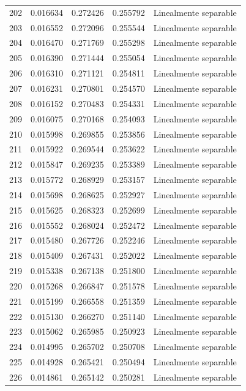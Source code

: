 \begin{tabular}{lllll}
202 & 0.016634 & 0.272426 & 0.255792 & Linealmente separable \\
203 & 0.016552 & 0.272096 & 0.255544 & Linealmente separable \\
204 & 0.016470 & 0.271769 & 0.255298 & Linealmente separable \\
205 & 0.016390 & 0.271444 & 0.255054 & Linealmente separable \\
206 & 0.016310 & 0.271121 & 0.254811 & Linealmente separable \\
207 & 0.016231 & 0.270801 & 0.254570 & Linealmente separable \\
208 & 0.016152 & 0.270483 & 0.254331 & Linealmente separable \\
209 & 0.016075 & 0.270168 & 0.254093 & Linealmente separable \\
210 & 0.015998 & 0.269855 & 0.253856 & Linealmente separable \\
211 & 0.015922 & 0.269544 & 0.253622 & Linealmente separable \\
212 & 0.015847 & 0.269235 & 0.253389 & Linealmente separable \\
213 & 0.015772 & 0.268929 & 0.253157 & Linealmente separable \\
214 & 0.015698 & 0.268625 & 0.252927 & Linealmente separable \\
215 & 0.015625 & 0.268323 & 0.252699 & Linealmente separable \\
216 & 0.015552 & 0.268024 & 0.252472 & Linealmente separable \\
217 & 0.015480 & 0.267726 & 0.252246 & Linealmente separable \\
218 & 0.015409 & 0.267431 & 0.252022 & Linealmente separable \\
219 & 0.015338 & 0.267138 & 0.251800 & Linealmente separable \\
220 & 0.015268 & 0.266847 & 0.251578 & Linealmente separable \\
221 & 0.015199 & 0.266558 & 0.251359 & Linealmente separable \\
222 & 0.015130 & 0.266270 & 0.251140 & Linealmente separable \\
223 & 0.015062 & 0.265985 & 0.250923 & Linealmente separable \\
224 & 0.014995 & 0.265702 & 0.250708 & Linealmente separable \\
225 & 0.014928 & 0.265421 & 0.250494 & Linealmente separable \\
226 & 0.014861 & 0.265142 & 0.250281 & Linealmente separable \\

\end{tabular}
